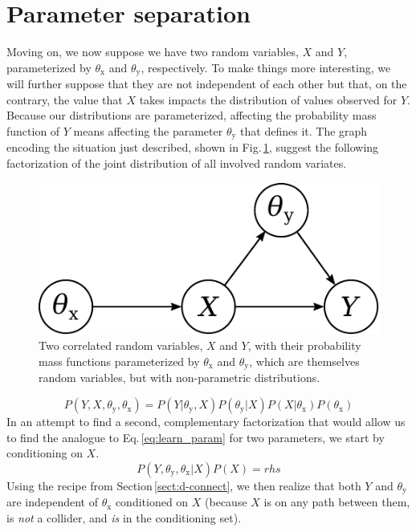 \documentclass[]{report}
\begin{document}
\section{Parameter separation} \label{sect:param-sep}
Moving on, we now suppose we have two random variables, $X$ and $Y$, parameterized by $\theta_\mathrm{x}$ and $\theta_\mathrm{y}$, respectively. To make things more interesting, we will further suppose that they are not independent of each other but that, on the contrary, the value that $X$ takes impacts the distribution of values observed for $Y$. Because our distributions are parameterized, affecting the probability mass function of $Y$ means affecting the parameter $\theta_\mathrm{y}$ that defines it. The graph encoding the situation just described, shown in Fig.\,\ref{fig:2var2param}, suggest the following factorization of the joint distribution of all involved random variates.
\begin{figure}[h]
	\centering
	\includegraphics[scale=0.5]{2var_2param}
	\caption{Two correlated random variables, $X$ and $Y$, with their probability mass functions parameterized by $\theta_\mathrm{x}$ and $\theta_\mathrm{y}$, which are themselves random variables, but with non-parametric distributions.}
	\label{fig:2var2param}
\end{figure}
\begin{equation} \label{eq:2param_from_G}
P( Y, X, \theta_\mathrm{y}, \theta_\mathrm{x} )
= 
P( Y | \theta_\mathrm{y}, X )
P( \theta_\mathrm{y} | X )
P( X | \theta_\mathrm{x} )
P( \theta_\mathrm{x} )
\end{equation}
In an attempt to find a second, complementary factorization that would allow us to find the analogue to Eq.\,\ref{eq:learn_param} for two parameters, we start by conditioning on $X$.
\begin{equation}
P( Y, \theta_\mathrm{y}, \theta_\mathrm{x} | X )
P( X ) 
=
rhs
\end{equation}
Using the recipe from Section\,\ref{sect:d-connect}, we then realize that both $Y$ and $\theta_\mathrm{y}$ are independent of $\theta_\mathrm{x}$ conditioned on $X$ (because $X$ is on any path between them, is \emph{not} a collider, and \emph{is} in the conditioning set).
\end{document}
